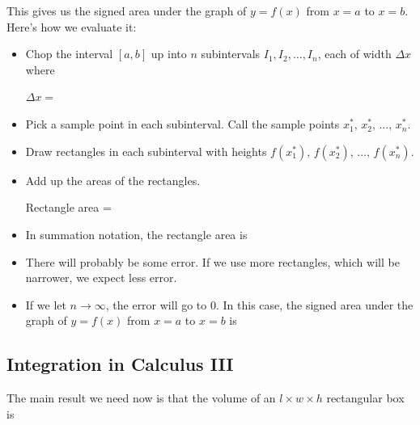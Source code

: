 \noindent
\begin{minipage}{.5\textwidth}
    This gives us the signed area under the graph of $y=f(x)$ from $x=a$ to $x=b$. Here's how we evaluate it:
    \begin{itemize}
        \item Chop the interval $[a,b]$ up into $n$ subintervals $I_1, I_2, \dots, I_n$, each of width $\Delta x$ where
        
        \medskip 
        {\centering 
            $\Delta x=\phantom{\frac{b-a}{n}}$
        \par}%
        
        \medskip 
        \item Pick a sample point in each subinterval. Call the sample points $x_1^*,\, x_2^*,\, \dots,\, x_n^*$.
        \item Draw rectangles in each subinterval with heights $f(x_1^*),\, f(x_2^*),\, \dots,\, f(x_n^*)$.
    \end{itemize}
\end{minipage}
\begin{itemize}
    \item Add up the areas of the rectangles. 
    
    \noindent Rectangle area = %
    \vspace{.3in}
    
    \item In summation notation, the rectangle area is 
    \vspace{.2in}
    
    \item There will probably be some error. If we use more rectangles, which will be narrower, we expect less error.
    \item If we let $n\to\infty$, the error will go to 0. In this case, the signed area under the graph of $y=f(x)$ from $x=a$ to $x=b$ is 
\end{itemize}
\vfill 

\pagebreak 

\subsection{Integration in Calculus III}
The main result we need now is that the volume of an $l\times w\times h$ rectangular box is %
\bigskip 

